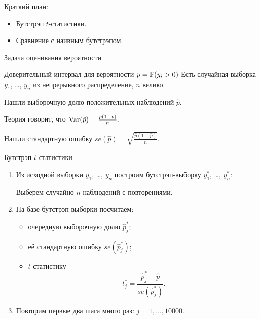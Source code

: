 
\begin{frame} %


\end{frame}



\begin{frame}{Краткий план:}
  \begin{itemize}[<+->]
    \item Бутстрэп $t$-статистики.
    \item Сравнение с наивным бутстрэпом.
  \end{itemize}

\end{frame}



\begin{frame}{Задача оценивания вероятности}

\begin{block}{Доверительный интервал для вероятности $p=\P(y_i > 0)$}
Есть случайная выборка $y_1$, \ldots, $y_n$ из непрерывного распределение, $n$ велико. 

\pause
Нашли выборочную долю положительных наблюдений $\hat p$. 

\pause
Теория говорит, что $\Var(\hat p) = \frac{p(1-p)}{n}$. 

\pause
Нашли стандартную ошибку $se(\hat p) = \sqrt{ \frac{\hat p (1 - \hat p)}{n} }$.
\end{block}

\end{frame}


\begin{frame}{Бутстрэп $t$-статистики}

\begin{enumerate}[<+->]
  \item Из исходной выборки $y_1$, \ldots, $y_n$ построим бутстрэп-выборку $y^*_1$, \ldots, $y^*_n$:

  Выберем случайно $n$ наблюдений с повторениями. 
  \item На базе бутстрэп-выборки посчитаем:
  \begin{itemize}
    \item очередную выборочную долю $\hat p_j^*$;
    \item её стандартную ошибку $se(\hat p_j^*)$;
    \item $t$-статистику 
    \[
    t^*_j = \frac{\hat p_j^* - \hat p}{se(\hat p_j^*)}.  
    \]
  \end{itemize}
  \item Повторим первые два шага много раз: $j = 1, \ldots, 10000$.
\end{enumerate}


\end{frame}
  


